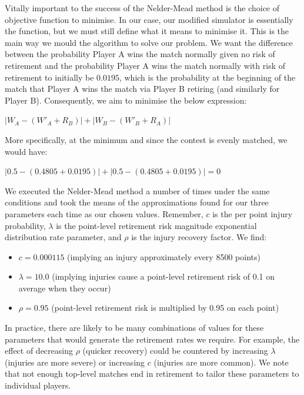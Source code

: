 \documentclass[letterpaper,12pt]{article}
\begin{document}
Vitally important to the success of the Nelder-Mead method is the choice of objective function to minimise.  In our case, our modified simulator is essentially the function, but we must still define what it means to minimise it.  This is the main way we mould the algorithm to solve our problem.  We want the difference between the probability Player A wins the match normally given no risk of retirement and the probability Player A wins the match normally with risk of retirement to initially be $0.0195$, which is the probability at the beginning of the match that Player A wins the match via Player B retiring (and similarly for Player B).  Consequently, we aim to minimise the below expression:

\begin{center}
	$\left|W_A - (W'_A + R_B)\right| + \left|W_B - (W'_B + R_A)\right|$
\end{center}

More specifically, at the minimum and since the contest is evenly matched, we would have:

\begin{center}
	$\left|0.5 - (0.4805 + 0.0195)\right| + \left|0.5 - (0.4805 + 0.0195)\right| = 0$
\end{center}

We executed the Nelder-Mead method a number of times under the same conditions and took the means of the approximations found for our three parameters each time as our chosen values.  Remember, $c$ is the per point injury probability, $\lambda$ is the point-level retirement risk magnitude exponential distribution rate parameter, and $\rho$ is the injury recovery factor.  We find:

\begin{itemize}
	\item $c = 0.000115$ (implying an injury approximately every 8500 points)
	\item $\lambda = 10.0$ (implying injuries cause a point-level retirement risk of 0.1 on average when they occur)
	\item $\rho = 0.95$ (point-level retirement risk is multiplied by 0.95 on each point)
\end{itemize}

In practice, there are likely to be many combinations of values for these parameters that would generate the retirement rates we require.  For example, the effect of decreasing $\rho$ (quicker recovery) could be countered by increasing $\lambda$ (injuries are more severe) or increasing $c$ (injuries are more common). We note that not enough top-level matches end in retirement to tailor these parameters to individual players.
\end{document}
